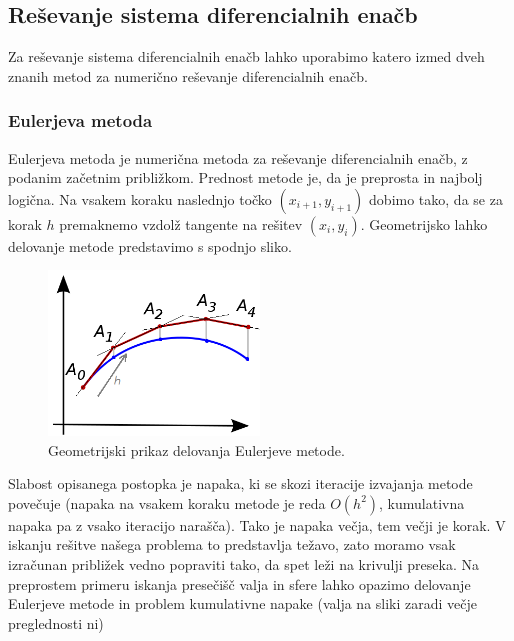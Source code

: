 \documentclass[12pt]{article}
\begin{document}
	\subsection{Reševanje sistema diferencialnih enačb}
	Za reševanje sistema diferencialnih enačb lahko uporabimo katero izmed dveh znanih metod za numerično reševanje diferencialnih enačb.
	\subsubsection{Eulerjeva metoda}
	Eulerjeva metoda je numerična metoda za reševanje diferencialnih enačb, z podanim začetnim približkom. Prednost metode je, da je preprosta in najbolj logična. Na vsakem koraku naslednjo točko $(x_{i+1},y_{i+1})$ dobimo tako, da se za korak $h$ premaknemo vzdolž tangente na rešitev $(x_{i},y_{i})$. Geometrijsko lahko delovanje metode predstavimo s spodnjo sliko.
	
	\begin{figure}[H]
		\centering
		\includegraphics[width=0.5\textwidth]{Euler_method_geom}
		\caption{Geometrijski prikaz delovanja Eulerjeve metode.}
		\label{slika:Euler_method_geom}
	\end{figure}
	
	Slabost opisanega postopka je napaka, ki se skozi iteracije izvajanja metode povečuje (napaka na vsakem koraku metode je reda $O(h^2)$, kumulativna napaka pa z vsako iteracijo narašča). Tako je napaka večja, tem večji je korak. V iskanju rešitve našega problema to predstavlja težavo, zato moramo vsak izračunan približek vedno popraviti tako, da spet leži na krivulji preseka. 
	Na preprostem primeru iskanja presečišč valja in sfere lahko opazimo delovanje Eulerjeve metode in problem kumulativne napake (valja na sliki zaradi večje preglednosti ni)
	
\end{document}
